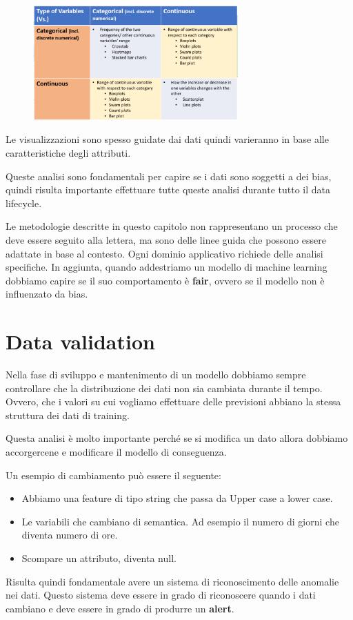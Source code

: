 \begin{figure}[!h]
      \centering
      \includegraphics[width=0.7\textwidth]{img/MLops/exploration.png}
\end{figure}

Le visualizzazioni sono spesso guidate dai dati quindi varieranno in base alle
caratteristiche degli attributi.

Queste analisi sono fondamentali per capire se i dati sono soggetti a dei bias,
quindi risulta importante effettuare tutte queste analisi durante tutto il data lifecycle.

Le metodologie descritte in questo capitolo non rappresentano un processo che deve
essere seguito alla lettera, ma sono delle linee guida che possono essere adattate
in base al contesto. Ogni dominio applicativo richiede delle analisi specifiche.
In aggiunta, quando addestriamo un modello di machine learning dobbiamo capire se
il suo comportamento è \textbf{fair}, ovvero se il modello non è influenzato da
bias.
\section{Data validation}
Nella fase di sviluppo e mantenimento di un modello dobbiamo sempre controllare
che la distribuzione dei dati non sia cambiata durante il tempo.
Ovvero, che i valori su cui vogliamo effettuare delle previsioni abbiano la stessa
struttura dei dati di training.

Questa analisi è molto importante perché se si modifica un dato allora dobbiamo
accorgercene e modificare il modello di conseguenza.

Un esempio di cambiamento può essere il seguente:
\begin{itemize}
      \item Abbiamo una feature di tipo string che passa da Upper case a lower case.
      \item Le variabili che cambiano di semantica. Ad esempio il numero di giorni
            che diventa numero di ore.
      \item Scompare un attributo, diventa null.
\end{itemize}
Risulta quindi fondamentale avere un sistema di riconoscimento delle anomalie
nei dati. Questo sistema deve essere in grado di riconoscere quando i dati cambiano
e deve essere in grado di produrre un \textbf{alert}.

